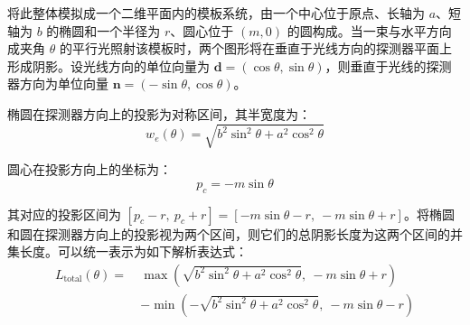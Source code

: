 将此整体模拟成一个二维平面内的模板系统，由一个中心位于原点、长轴为 $a$、短轴为 $b$ 的椭圆和一个半径为 $r$、圆心位于 $(m, 0)$ 的圆构成。当一束与水平方向成夹角 $\theta$ 的平行光照射该模板时，两个图形将在垂直于光线方向的探测器平面上形成阴影。设光线方向的单位向量为 $\mathbf{d} = (\cos\theta, \sin\theta)$，则垂直于光线的探测器方向为单位向量 $\mathbf{n} = (-\sin\theta, \cos\theta)$。

椭圆在探测器方向上的投影为对称区间，其半宽度为：
\[
w_e(\theta) = \sqrt{b^2 \sin^2\theta + a^2 \cos^2\theta}
\]

圆心在投影方向上的坐标为：
\[
p_c = -m \sin\theta
\]

其对应的投影区间为 $[p_c - r,\ p_c + r] = [-m \sin\theta - r,\ -m \sin\theta + r]$。将椭圆和圆在探测器方向上的投影视为两个区间，则它们的总阴影长度为这两个区间的并集长度。可以统一表示为如下解析表达式：
\begin{equation}
\begin{split}
L_{\text{total}}(\theta) =\ & \max\left( \sqrt{b^2 \sin^2\theta + a^2 \cos^2\theta},\ -m \sin\theta + r \right) \\
& - \min\left( -\sqrt{b^2 \sin^2\theta + a^2 \cos^2\theta},\ -m \sin\theta - r \right)
\end{split}
\end{equation}











